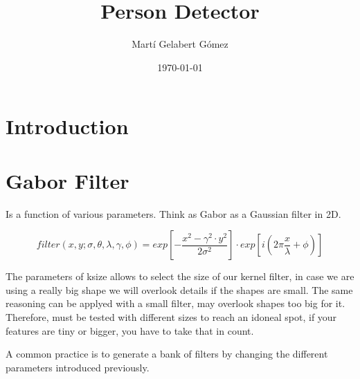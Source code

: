 \documentclass[11pt,twoside,a4paper]{article}
\title{Person Detector}
\author{Martí Gelabert Gómez}
\date{\today}
\begin{document}
\maketitle

\section{Introduction}


\section{Gabor Filter}

Is a function of various parameters.
Think as Gabor as a Gaussian filter in 2D.

\begin{equation}
    filter(x,y;\sigma,\theta,\lambda,\gamma,\phi) = exp [ - \frac{x^2 - \gamma ^2 \cdot y^2}{2 \sigma^2} ] \cdot exp [ i (2 \pi \frac{x}{\lambda} + \phi) ] 
\end{equation}

The parameters of ksize allows to select the size of our kernel filter, in case we are using a really big shape we will overlook details if the shapes are small. The same reasoning can be applyed with a small filter, may overlook shapes too big for it. Therefore, must be tested with different sizes to reach an idoneal spot, if your features are tiny or bigger, you have to take that in count.

A common practice is to generate a bank of filters by changing the different parameters introduced previously.
    
\end{document}
